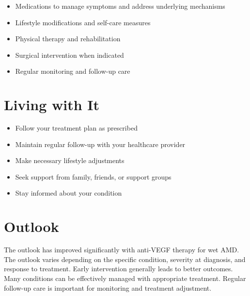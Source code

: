 \begin{itemize}[noitemsep]
  \item Medications to manage symptoms and address underlying mechanisms
  \item Lifestyle modifications and self-care measures
  \item Physical therapy and rehabilitation
  \item Surgical intervention when indicated
  \item Regular monitoring and follow-up care
\end{itemize}
\section{Living with It}
\begin{itemize}[noitemsep]
  \item Follow your treatment plan as prescribed
  \item Maintain regular follow-up with your healthcare provider
  \item Make necessary lifestyle adjustments
  \item Seek support from family, friends, or support groups
  \item Stay informed about your condition
\end{itemize}
\section{Outlook}
The outlook has improved significantly with anti-VEGF therapy for wet AMD. The outlook varies depending on the specific condition, severity at diagnosis, and response to treatment. Early intervention generally leads to better outcomes. Many conditions can be effectively managed with appropriate treatment. Regular follow-up care is important for monitoring and treatment adjustment.

